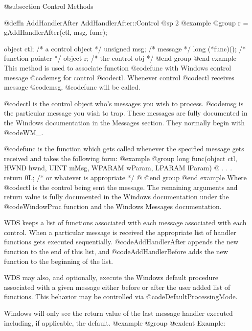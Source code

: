 @subsection Control Methods












@deffn {AddHandlerAfter} AddHandlerAfter::Control
@sp 2
@example
@group
r = gAddHandlerAfter(ctl, msg, func);

object   ctl;      /*  a control object  */
unsigned msg;      /*  message           */
long    (*func)(); /*  function pointer  */
object  r;         /*  the control obj   */
@end group
@end example
This method is used to associate function @code{func} with Windows control
message @code{msg} for control @code{ctl}.  Whenever control @code{ctl}
receives message @code{msg}, @code{func} will be called.

@code{ctl} is the control object who's messages you wish to process.
@code{msg} is the particular message you wish to trap.  These messages
are fully documented in the Windows documentation in the Messages
section.  They normally begin with @code{WM_}.

@code{func} is the function which gets called whenever the specified
message gets received and takes the following form:
@example
@group
long    func(object     ctl,
             HWND       hwnd, 
             UINT       mMsg, 
             WPARAM     wParam, 
             LPARAM     lParam)
@{
        .
        .
        .
        return 0L;  /* or whatever is appropriate  */
@}
@end group
@end example
Where @code{ctl} is the control being sent the message.  The remaining
arguments and return value is fully documented in the Windows documentation
under the @code{WindowProc} function and the Windows Messages documentation.

WDS keeps a list of functions associated with each message associated
with each control.  When a particular message is received the appropriate
list of handler functions gets executed sequentially.
@code{AddHandlerAfter} appends the new function to the end of this list,
and @code{AddHandlerBefore} adds the new function to the beginning of
the list.

WDS may also, and optionally, execute the Windows default procedure
associated with a given message either before or after the user added
list of functions.  This behavior may be controlled via
@code{DefaultProcessingMode}.

Windows will only see the return value of the last message handler executed
including, if applicable, the default.
@example
@group
@exdent Example:

